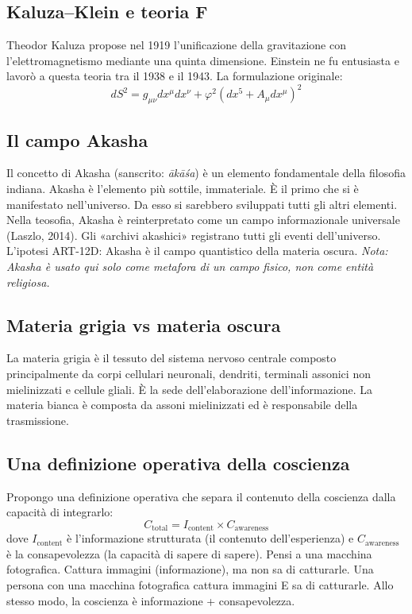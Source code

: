 \documentclass[11pt,a4paper]{article}
\begin{document}
\subsection{Kaluza--Klein e teoria F}
Theodor Kaluza propose nel 1919 l'unificazione della gravitazione con l'elettromagnetismo mediante una quinta dimensione. Einstein ne fu entusiasta e lavorò a questa teoria tra il 1938 e il 1943. La formulazione originale:
\begin{equation}
dS^2 = g_{\mu\nu} dx^\mu dx^\nu + \varphi^2(dx^5 + A_{\mu} dx^\mu)^2
\end{equation}

\subsection{Il campo Akasha}
Il concetto di Akasha (sanscrito: \emph{ākāśa}) è un elemento fondamentale della filosofia indiana. Akasha è l'elemento più sottile, immateriale. È il primo che si è manifestato nell'universo. Da esso si sarebbero sviluppati tutti gli altri elementi. Nella teosofia, Akasha è reinterpretato come un campo informazionale universale (Laszlo, 2014). Gli «archivi akashici» registrano tutti gli eventi dell'universo. L'ipotesi ART-12D: Akasha è il campo quantistico della materia oscura. \textit{Nota: Akasha è usato qui solo come metafora di un campo fisico, non come entità religiosa.}

\subsection{Materia grigia vs materia oscura}
La materia grigia è il tessuto del sistema nervoso centrale composto principalmente da corpi cellulari neuronali, dendriti, terminali assonici non mielinizzati e cellule gliali. È la sede dell'elaborazione dell'informazione. La materia bianca è composta da assoni mielinizzati ed è responsabile della trasmissione.

\subsection{Una definizione operativa della coscienza}
Propongo una definizione operativa che separa il contenuto della coscienza dalla capacità di integrarlo:
\begin{equation}
C_{\text{total}} = I_{\text{content}} \times C_{\text{awareness}}
\end{equation}
dove $I_{\text{content}}$ è l'informazione strutturata (il contenuto dell'esperienza) e $C_{\text{awareness}}$ è la consapevolezza (la capacità di sapere di sapere). Pensi a una macchina fotografica. Cattura immagini (informazione), ma non sa di catturarle. Una persona con una macchina fotografica cattura immagini E sa di catturarle. Allo stesso modo, la coscienza è informazione + consapevolezza.
\end{document}
